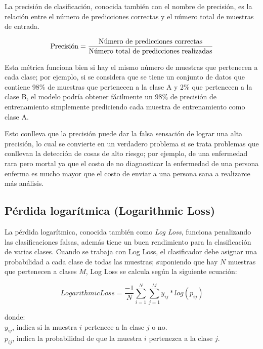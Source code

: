 La precisi\'{o}n de clasificaci\'{o}n, conocida tambi\'{e}n con el nombre de precisi\'{o}n, es la relaci\'{o}n entre el n\'{u}mero de predicciones correctas y el n\'{u}mero total de muestras de entrada.

\begin{equation}
\textup{Precisi\'{o}n} = \frac{\textup{N\'{u}mero de predicciones correctas}}{\textup{N\'{u}mero total de predicciones realizadas}}
\end{equation}

Esta m\'{e}trica funciona bien si hay el mismo n\'{u}mero de muestras que pertenecen a cada clase; por ejemplo, si se considera que se tiene un conjunto de datos que contiene 98\% de muestras que pertenecen a la clase A y 2\% que pertenecen a la clase B, el modelo podr\'{i}a obtener f\'{a}cilmente un 98\% de precisi\'{o}n de entrenamiento simplemente prediciendo cada muestra de entrenamiento como clase A. 

\vspace{5mm} %

Esto conlleva que la precisi\'{o}n puede dar la falsa sensaci\'{o}n de lograr una alta precisi\'{o}n, lo cual se convierte en un verdadero problema si se trata problemas que conllevan la detecci\'{o}n de cosas de alto riesgo; por ejemplo, de una enfermedad rara pero mortal ya que el costo de no diagnosticar la enfermedad de una persona enferma es mucho mayor que el costo de enviar a una persona sana a realizarce  m\'{a}s an\'{a}lisis.

\subsection{P\'{e}rdida logar\'{i}tmica (Logarithmic Loss)}

La p\'{e}rdida logar\'{i}tmica, conocida tambi\'{e}n como \textit{Log Loss}, funciona penalizando las clasificaciones falsas, adem\'{a}s tiene un buen rendimiento para la clasificaci\'{o}n de varias clases. Cuando se trabaja con Log Loss, el clasificador debe asignar una probabilidad a cada clase de todas las muestras; suponiendo que hay $N$ muestras que pertenecen a clases $M$, Log Loss se calcula seg\'{u}n la siguiente ecuaci\'{o}n:

\begin{equation}
LogarithmicLoss = \frac{-1}{N}\sum_{i=1}^{N}\sum_{j=1}^{M} y_{ij}*log(p_{ij})
\end{equation}

donde:
\\
$y_{ij}$, indica si la muestra $i$ pertenece a la clase $j$ o no.\\
$p_{ij}$, indica la probabilidad de que la muestra $i$ pertenezca a la clase $j$.

